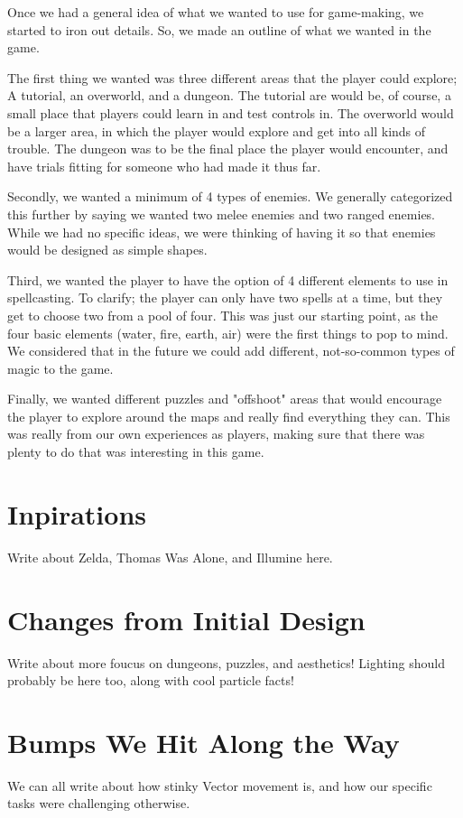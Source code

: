 \documentclass{sigchi}
\begin{document}
Once we had a general idea of what we wanted to use for game-making, we started to iron out details. So, we made an outline of what we wanted in the game.

The first thing we wanted was three different areas that the player could explore; A tutorial, an overworld, and a dungeon. The tutorial are would be, of course,
a small place that players could learn in and test controls in. The overworld would be a larger area, in which the player would explore and get into all kinds of
trouble. The dungeon was to be the final place the player would encounter, and have trials fitting for someone who had made it thus far.

Secondly, we wanted a minimum of 4 types of enemies. We generally categorized this further by saying we wanted two melee enemies and two ranged enemies. While
we had no specific ideas, we were thinking of having it so that enemies would be designed as simple shapes.

Third, we wanted the player to have the option of 4 different elements to use in spellcasting. To clarify; the player can only have two spells at a time, but they
get to choose two from a pool of four. This was just our starting point, as the four basic elements (water, fire, earth, air) were the first things to pop to mind.
We considered that in the future we could add different, not-so-common types of magic to the game.

Finally, we wanted different puzzles and "offshoot" areas that would encourage the player to explore around the maps and really find everything they can. This was
really from our own experiences as players, making sure that there was plenty to do that was interesting in this game.



\section{Inpirations}
Write about Zelda, Thomas Was Alone, and Illumine here.



\section{Changes from Initial Design}
Write about more foucus on dungeons, puzzles, and aesthetics! Lighting should probably be here too, along with cool particle facts!



\section{Bumps We Hit Along the Way}
We can all write about how stinky Vector movement is, and how our specific tasks were challenging otherwise.





\end{document}
